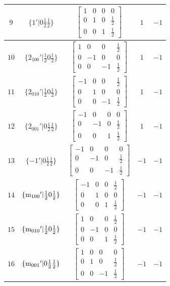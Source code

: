 \documentclass[fleqn,8pt]{jsarticle}
\begin{document}
\begin{longtable}{ccccc}
$ 9 $ & $ \{1{}'|0 \frac{1}{2} \frac{1}{2}\} $ & $ \begin{bmatrix} 1 & 0 & 0 & 0 \\ 0 & 1 & 0 & \frac{1}{2} \\ 0 & 0 & 1 & \frac{1}{2} \end{bmatrix} $ & $ 1 $ & $ -1 $ \\ \hline
$ 10 $ & $ \{2{}_{100}{}'|\frac{1}{2} 0 \frac{1}{2}\} $ & $ \begin{bmatrix} 1 & 0 & 0 & \frac{1}{2} \\ 0 & -1 & 0 & 0 \\ 0 & 0 & -1 & \frac{1}{2} \end{bmatrix} $ & $ 1 $ & $ -1 $ \\ \hline
$ 11 $ & $ \{2{}_{010}{}'|\frac{1}{2} 0 \frac{1}{2}\} $ & $ \begin{bmatrix} -1 & 0 & 0 & \frac{1}{2} \\ 0 & 1 & 0 & 0 \\ 0 & 0 & -1 & \frac{1}{2} \end{bmatrix} $ & $ 1 $ & $ -1 $ \\ \hline
$ 12 $ & $ \{2{}_{001}{}'|0 \frac{1}{2} \frac{1}{2}\} $ & $ \begin{bmatrix} -1 & 0 & 0 & 0 \\ 0 & -1 & 0 & \frac{1}{2} \\ 0 & 0 & 1 & \frac{1}{2} \end{bmatrix} $ & $ 1 $ & $ -1 $ \\ \hline
$ 13 $ & $ \{-1{}'|0 \frac{1}{2} \frac{1}{2}\} $ & $ \begin{bmatrix} -1 & 0 & 0 & 0 \\ 0 & -1 & 0 & \frac{1}{2} \\ 0 & 0 & -1 & \frac{1}{2} \end{bmatrix} $ & $ -1 $ & $ -1 $ \\ \hline
$ 14 $ & $ \{{\rm m}_{100}{}'|\frac{1}{2} 0 \frac{1}{2}\} $ & $ \begin{bmatrix} -1 & 0 & 0 & \frac{1}{2} \\ 0 & 1 & 0 & 0 \\ 0 & 0 & 1 & \frac{1}{2} \end{bmatrix} $ & $ -1 $ & $ -1 $ \\ \hline
$ 15 $ & $ \{{\rm m}_{010}{}'|\frac{1}{2} 0 \frac{1}{2}\} $ & $ \begin{bmatrix} 1 & 0 & 0 & \frac{1}{2} \\ 0 & -1 & 0 & 0 \\ 0 & 0 & 1 & \frac{1}{2} \end{bmatrix} $ & $ -1 $ & $ -1 $ \\ \hline
$ 16 $ & $ \{{\rm m}_{001}{}'|0 \frac{1}{2} \frac{1}{2}\} $ & $ \begin{bmatrix} 1 & 0 & 0 & 0 \\ 0 & 1 & 0 & \frac{1}{2} \\ 0 & 0 & -1 & \frac{1}{2} \end{bmatrix} $ & $ -1 $ & $ -1 $ \\
\end{longtable}
\end{document}
